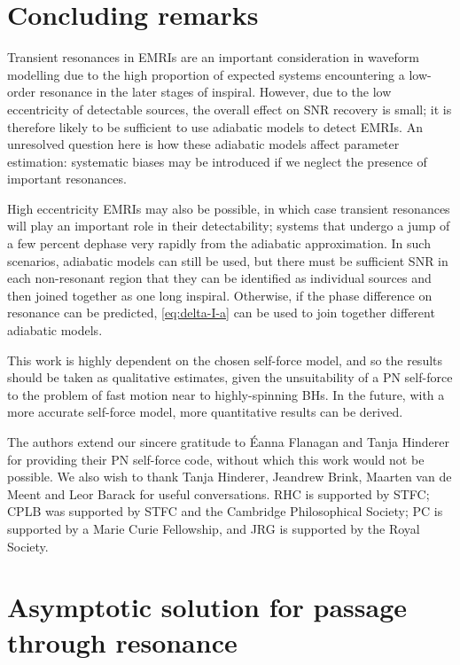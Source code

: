 \documentclass[aps,prd,amsfonts,amssymb,amsmath,nofootinbib,reprint,showpacs]{revtex4}
\begin{document}
\section{Concluding remarks}

Transient resonances in EMRIs are an important consideration in waveform modelling due to the high proportion of expected systems encountering a low-order resonance in the later stages of inspiral. However, due to the low eccentricity of detectable sources, the overall effect on SNR recovery is small; it is therefore likely to be sufficient to use adiabatic models to detect EMRIs. An unresolved question here is how these adiabatic models affect parameter estimation: systematic biases may be introduced if we neglect the presence of important resonances.

High eccentricity EMRIs may also be possible, in which case transient resonances will play an important role in their detectability; systems that undergo a jump of a few percent dephase very rapidly from the adiabatic approximation. In such scenarios, adiabatic models can still be used, but there must be sufficient SNR in each non-resonant region that they can be identified as individual sources and then joined together as one long inspiral. Otherwise, if the phase difference on resonance can be predicted, \eqref{eq:delta-I-a} can be used to join together different adiabatic models.

This work is highly dependent on the chosen self-force model, and so the results should be taken as qualitative estimates, given the unsuitability of a PN self-force to the problem of fast motion near to highly-spinning BHs. In the future, with a more accurate self-force model, more quantitative results can be derived.

\begin{acknowledgments}
The authors extend our sincere gratitude to \'{E}anna Flanagan and Tanja Hinderer for providing their PN self-force code, without which this work would not be possible. We also wish to thank Tanja Hinderer, Jeandrew Brink, Maarten van de Meent and Leor Barack for useful conversations. RHC is supported by STFC; CPLB was supported by STFC and the Cambridge Philosophical Society; PC is supported by a Marie Curie Fellowship, and JRG is supported by the Royal Society.
\end{acknowledgments}

\appendix

\section{Asymptotic solution for passage through resonance}\label{sec:res-asymptotic}




\end{document}

